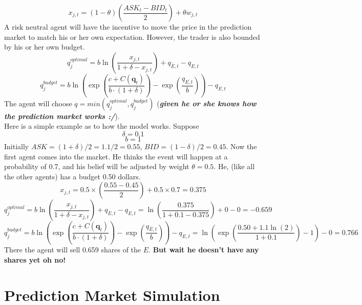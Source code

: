 \documentclass{article}
\begin{document}
\begin{displaymath}
x_{j,t}=(1-\theta)(\frac{ASK_t-BID_t}{2})+\theta w_{j,t}
\end{displaymath}
A risk neutral agent will have the incentive to move the price in the prediction market to match his or her own expectation. However, the trader is also bounded by his or her own budget.
\begin{displaymath}
q_j^{optimal}=b\ln({\frac{x_{j,t}}{1+\delta-x_{j,t}}})+q_{\overline{E},t}-q_{E,t}
\end{displaymath}
\begin{displaymath}
q_j^{budget}=b\ln({\exp(\frac{c+C(\textbf{q}_t)}{b\cdot (1+\delta)})-\exp(\frac{q_{\overline{{E},t}}}{b})})-q_{E,t}
\end{displaymath}
The agent will choose $q=min(q_j^{optimal}, q_j^{budget})$ (\textbf{\emph{given he or she knows how the prediction market works :/}}). \\
Here is a simple example as to how the model works. Suppose
\begin{displaymath}
\delta = 0.1
\end{displaymath}
\begin{displaymath}
b = 1
\end{displaymath}
Initially $ASK=(1+\delta)/2=1.1/2=0.55$, $BID=(1-\delta)/2=0.45$.
Now the first agent comes into the market. He thinks the event will happen at a probability of 0.7, and his belief will be adjusted by weight $\theta=0.5$. He, (like all the other agents) has a budget 0.50 dollars.
\begin{displaymath}
x_{j,t}=0.5\times (\frac{0.55-0.45}{2})+0.5\times 0.7=0.375
\end{displaymath}
\begin{displaymath}
q_j^{optimal}=b\ln({\frac{x_{j,t}}{1+\delta-x_{j,t}}})+q_{\overline{E},t}-q_{E,t}=\ln({\frac{0.375}{1+0.1-0.375}})+0-0=-0.659
\end{displaymath}
\begin{displaymath}
q_j^{budget}=b\ln({\exp(\frac{c+C(\textbf{q}_t)}{b\cdot (1+\delta)})-\exp(\frac{q_{\overline{{E}},t}}{b})})-q_{E,t}=\ln({\exp(\frac{0.50+1.1\ln(2)}{1+0.1})-1})-0=0.766
\end{displaymath}
There the agent will sell 0.659 shares of the $E$. \textbf{But wait he doesn't have any shares yet oh no!}

    \section{Prediction Market Simulation}
\end{document}
